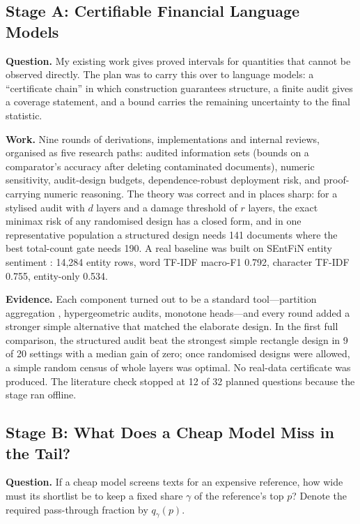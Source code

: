 \documentclass[11pt]{article}
\begin{document}
\subsection{Stage A: Certifiable Financial Language Models}

\textbf{Question.} My existing work gives proved intervals for quantities that cannot be observed directly. The plan was to carry this over to language models: a ``certificate chain'' in which construction guarantees structure, a finite audit gives a coverage statement, and a bound carries the remaining uncertainty to the final statistic.

\textbf{Work.} Nine rounds of derivations, implementations and internal reviews, organised as five research paths: audited information sets (bounds on a comparator's accuracy after deleting contaminated documents), numeric sensitivity, audit-design budgets, dependence-robust deployment risk, and proof-carrying numeric reasoning. The theory was correct and in places sharp: for a stylised audit with $d$ layers and a damage threshold of $r$ layers, the exact minimax risk of any randomised design has a closed form, and in one representative population a structured design needs 141 documents where the best total-count gate needs 190. A real baseline was built on SEntFiN entity sentiment \citep{sinha2022sentfin}: 14,284 entity rows, word TF-IDF macro-F1 0.792, character TF-IDF 0.755, entity-only 0.534.

\textbf{Evidence.} Each component turned out to be a standard tool---partition aggregation \citep{levine2021deep}, hypergeometric audits, monotone heads---and every round added a stronger simple alternative that matched the elaborate design. In the first full comparison, the structured audit beat the strongest simple rectangle design in 9 of 20 settings with a median gain of zero; once randomised designs were allowed, a simple random census of whole layers was optimal. No real-data certificate was produced. The literature check stopped at 12 of 32 planned questions because the stage ran offline.

\subsection{Stage B: What Does a Cheap Model Miss in the Tail?}

\textbf{Question.} If a cheap model screens texts for an expensive reference, how wide must its shortlist be to keep a fixed share $\gamma$ of the reference's top $p$? Denote the required pass-through fraction by $q_\gamma(p)$.
\end{document}
